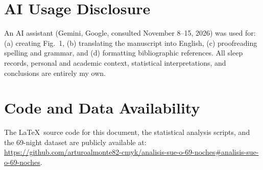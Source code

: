 \documentclass[conference]{IEEEtran}
\begin{document}
\section*{AI Usage Disclosure}
An AI assistant (Gemini, Google, consulted November 8--15, 2026) was used for: (a) creating Fig.~1, (b) translating the manuscript into English, (c) proofreading spelling and grammar, and (d) formatting bibliographic references. All sleep records, personal and academic context, statistical interpretations, and conclusions are entirely my own.

\section*{Code and Data Availability}
The \LaTeX\ source code for this document, the statistical analysis scripts, and the 69-night dataset are publicly available at: \url{https://github.com/arturoalmonte82-cmyk/analisis-sue-o-69-noches#analisis-sue-o-69-noches}.
\end{document}
